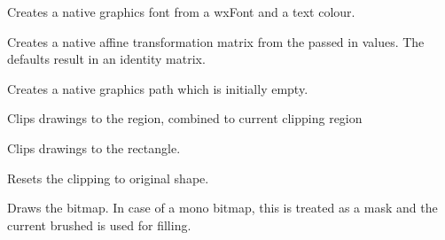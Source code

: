 
Creates a native graphics font from a wxFont and a text colour.

\label{wxgraphicscontextcreatematrix}


Creates a native affine transformation matrix from the passed in values. The defaults result in an identity matrix.

\label{wxgraphicscontextcreatepath}


Creates a native graphics path which is initially empty.

\label{wxgraphicscontextclip}


Clips drawings to the region, combined to current clipping region


Clips drawings to the rectangle.

\label{wxgraphicscontextresetclip}


Resets the clipping to original shape.

\label{wxgraphicscontextdrawbitmap}


Draws the bitmap. In case of a mono bitmap, this is treated as a mask and the current brushed is used for filling.

\label{wxgraphicscontextdrawellipse}


